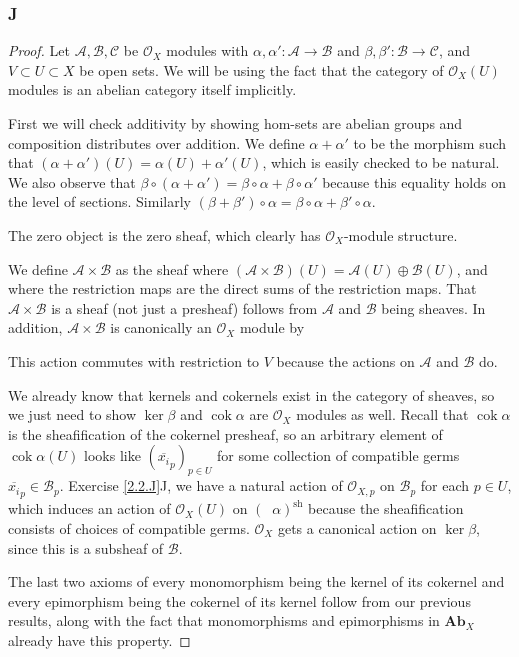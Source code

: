 \documentclass{article}
\newcommand{\fA}{\mathscr{A}}
\newcommand{\fB}{\mathscr{B}}
\newcommand{\fC}{\mathscr{C}}
\newcommand{\fO}{\mathscr{O}}
\DeclareMathOperator{\cok}{cok}
\DeclareMathOperator{\cokpre}{\cok_{\text{pre}}}
\DeclareMathOperator{\sh}{sh}
\newcommand{\Ab}{\mathbf{Ab}} %
\begin{document}
\subsubsection{J}\label{2.6.J}
\begin{proof}
     Let $\fA, \fB, \fC$ be $\fO_X$ modules with $\alpha, \alpha':\fA \to \fB$ and $\beta,\beta': \fB \to \fC$, and $V\subset U\subset X$ be open sets. We will be using the fact that the category of $\fO_X(U)$ modules is an abelian category itself implicitly.
     
     First we will check additivity by showing hom-sets are abelian groups and composition distributes over addition. We define $\alpha+\alpha'$ to be the morphism such that $(\alpha+\alpha')(U)=\alpha(U)+\alpha'(U)$, which is easily checked to be natural. We also observe that $\beta \circ (\alpha+\alpha')=\beta \circ \alpha + \beta \circ \alpha'$ because this equality holds on the level of sections. Similarly $(\beta+\beta')\circ \alpha = \beta \circ \alpha + \beta' \circ \alpha$.

     The zero object is the zero sheaf, which clearly has $\fO_X$-module structure.

     We define $\fA \times \fB$ as the sheaf where $(\fA\times \fB)(U)=\fA(U)\oplus \fB(U)$, and where the restriction maps are the direct sums of the restriction maps. That $\fA \times \fB$ is a sheaf (not just a presheaf) follows from $\fA$ and $\fB$ being sheaves. In addition, $\fA\times \fB$ is canonically an $\fO_X$ module by
     \begin{center}
     \end{center}
     This action commutes with restriction to $V$ because the actions on $\fA$ and $\fB$ do.

     We already know that kernels and cokernels exist in the category of sheaves, so we just need to show $\ker \beta$ and $\cok \alpha$ are $\fO_X$ modules as well. Recall that $\cok \alpha$ is the sheafification of the cokernel presheaf, so an arbitrary element of $\cok \alpha(U)$ looks like $(\overline{x_i}_p)_{p\in U}$ for some collection of compatible germs $\overline{x_i}_p\in \fB_p$. Exercise \ref{2.2.J}J, we have a natural action of $\fO_{X,p}$ on $\fB_p$ for each $p\in U$, which induces an action of $\fO_X(U)$ on $(\cokpre \alpha)^{\sh}$ because the sheafification consists of choices of compatible germs. $\fO_X$ gets a canonical action on $\ker \beta$, since this is a subsheaf of $\fB$.

     The last two axioms of every monomorphism being the kernel of its cokernel and every epimorphism being the cokernel of its kernel follow from our previous results, along with the fact that monomorphisms and epimorphisms in $\Ab_X$ already have this property.
\end{proof}
\end{document}
